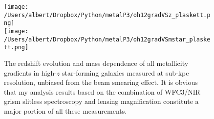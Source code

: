 \begin{figure}
    \centering
    \texttt{[image: /Users/albert/Dropbox/Python/metalP3/oh12gradVSz\_plaskett.png]}\\
    \texttt{[image: /Users/albert/Dropbox/Python/metalP3/oh12gradVSmstar\_plaskett.png]}
    \caption[The redshift evolution and mass dependence of all \emph{unbiasedly} measured metallicity gradients
    in high-$z$ star-forming galaxies.]
    {The redshift evolution and mass dependence of all metallicity gradients in high-$z$ star-forming galaxies 
    measured at sub-kpc resolution, unbiased from the beam smearing effect. It is obvious that my analysis results based on the
    combination of \hst WFC3/NIR grism slitless spectroscopy and lensing magnification constitute a major portion
    of all these measurements.}
    \label{fig:full_metalgrad}
\end{figure}

